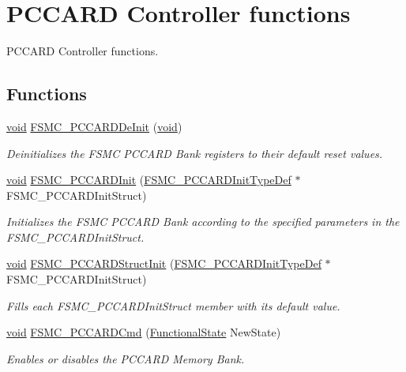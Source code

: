\hypertarget{group___f_s_m_c___group3}{\section{P\-C\-C\-A\-R\-D Controller functions}
\label{group___f_s_m_c___group3}
}


P\-C\-C\-A\-R\-D Controller functions.  


\subsection*{Functions}
\begin{DoxyCompactItemize}
\item 
\hyperlink{group___n_a_m_e_ga18028b8badbf1ea7e704ccac3c488e82}{void} \hyperlink{group___f_s_m_c___group3_ga2f53ccf3a4f3c80a5a56fb47ccd47ccd}{F\-S\-M\-C\-\_\-\-P\-C\-C\-A\-R\-D\-De\-Init} (\hyperlink{group___n_a_m_e_ga18028b8badbf1ea7e704ccac3c488e82}{void})
\begin{DoxyCompactList}\small\item\em Deinitializes the F\-S\-M\-C P\-C\-C\-A\-R\-D Bank registers to their default reset values. \end{DoxyCompactList}\item 
\hyperlink{group___n_a_m_e_ga18028b8badbf1ea7e704ccac3c488e82}{void} \hyperlink{group___f_s_m_c___group3_gacee1351363e7700a296faa1734a910aa}{F\-S\-M\-C\-\_\-\-P\-C\-C\-A\-R\-D\-Init} (\hyperlink{struct_f_s_m_c___p_c_c_a_r_d_init_type_def}{F\-S\-M\-C\-\_\-\-P\-C\-C\-A\-R\-D\-Init\-Type\-Def} $\ast$F\-S\-M\-C\-\_\-\-P\-C\-C\-A\-R\-D\-Init\-Struct)
\begin{DoxyCompactList}\small\item\em Initializes the F\-S\-M\-C P\-C\-C\-A\-R\-D Bank according to the specified parameters in the F\-S\-M\-C\-\_\-\-P\-C\-C\-A\-R\-D\-Init\-Struct. \end{DoxyCompactList}\item 
\hyperlink{group___n_a_m_e_ga18028b8badbf1ea7e704ccac3c488e82}{void} \hyperlink{group___f_s_m_c___group3_ga7a64ba0e0545b3f1913c9d1d28c05e62}{F\-S\-M\-C\-\_\-\-P\-C\-C\-A\-R\-D\-Struct\-Init} (\hyperlink{struct_f_s_m_c___p_c_c_a_r_d_init_type_def}{F\-S\-M\-C\-\_\-\-P\-C\-C\-A\-R\-D\-Init\-Type\-Def} $\ast$F\-S\-M\-C\-\_\-\-P\-C\-C\-A\-R\-D\-Init\-Struct)
\begin{DoxyCompactList}\small\item\em Fills each F\-S\-M\-C\-\_\-\-P\-C\-C\-A\-R\-D\-Init\-Struct member with its default value. \end{DoxyCompactList}\item 
\hyperlink{group___n_a_m_e_ga18028b8badbf1ea7e704ccac3c488e82}{void} \hyperlink{group___f_s_m_c___group3_ga2d410151ceb3428c6a1bf374a0472cde}{F\-S\-M\-C\-\_\-\-P\-C\-C\-A\-R\-D\-Cmd} (\hyperlink{group___exported__types_gac9a7e9a35d2513ec15c3b537aaa4fba1}{Functional\-State} New\-State)
\begin{DoxyCompactList}\small\item\em Enables or disables the P\-C\-C\-A\-R\-D Memory Bank. \end{DoxyCompactList}\end{DoxyCompactItemize}


